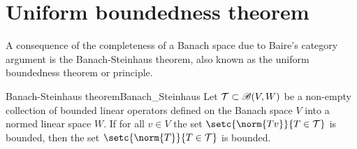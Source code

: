 \section{Uniform boundedness theorem}
A consequence of the completeness of a Banach space due to Baire's category argument is the Banach-Steinhaus theorem, also known as the uniform boundedness theorem or principle. %
\begin{theorem}{Banach-Steinhaus theorem}{Banach_Steinhaus}
    Let \(\mathcal{T} \subset \mathscr{B}{(V,W)}\) be a non-empty collection of bounded linear operators defined on the Banach space \(V\) into a normed linear space \(W\). If for all \(v \in V\) the set \(\setc{\norm{Tv}}{T \in \mathcal{T}}\) is bounded, then the set \(\setc{\norm{T}}{T \in \mathcal{T}}\) is bounded.
\end{theorem}
